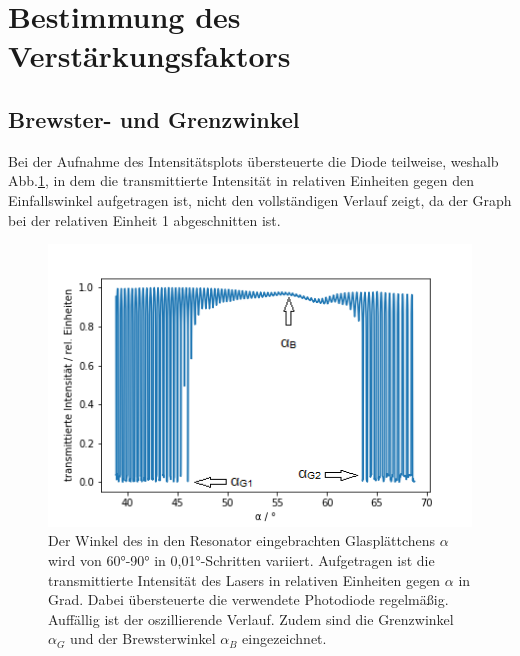 
\section{Bestimmung des Verstärkungsfaktors}
\subsection{Brewster- und Grenzwinkel}

Bei der Aufnahme des Intensitätsplots übersteuerte die Diode teilweise, 
weshalb Abb.\ref{plot:Talpha}, in dem die transmittierte Intensität in relativen Einheiten gegen den Einfallswinkel aufgetragen ist, nicht den vollständigen Verlauf zeigt, 
da der Graph bei der relativen Einheit 1 abgeschnitten ist. 

\begin{figure}[h]
    \centering
    \includegraphics[scale = 1.5]{Bilder/Auswertung/brewsterpfeil.png}
    \caption{Der Winkel des in den Resonator eingebrachten Glasplättchens $\alpha$ wird von 60°-90° in 0,01°-Schritten variiert. Aufgetragen ist die transmittierte Intensität 
    des Lasers in relativen Einheiten gegen $\alpha$ in Grad. Dabei übersteuerte die verwendete Photodiode regelmäßig. Auffällig ist der oszillierende Verlauf. 
    Zudem sind die Grenzwinkel $\alpha_G$ und der Brewsterwinkel $\alpha_B$ eingezeichnet.}
    \label{plot:Talpha}
\end{figure}

